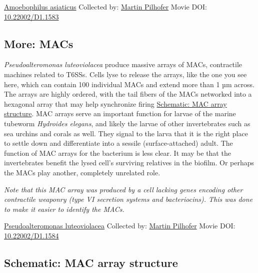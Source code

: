 \documentclass[]{tufte-book}
\begin{document}
\hypertarget{htmlwidget-f246613a8b3240c64a16}{}

\label{fig:9-7a}\protect\hyperlink{tree}{Amoebophilus asiaticus} Collected by: \protect\hyperlink{martin_pilhofer}{Martin Pilhofer} Movie DOI: \href{https://doi.org/10.22002/D1.1583}{10.22002/D1.1583}

\hypertarget{MACs}{%
\subsection*{More: MACs}\label{MACs}}

\emph{Pseudoalteromonas luteoviolacea} produce massive arrays of MACs, contractile machines related to T6SSs. Cells lyse to release the arrays, like the one you see here, which can contain 100 individual MACs and extend more than 1 µm across. The arrays are highly ordered, with the tail fibers of the MACs networked into a hexagonal array that may help synchronize firing \protect\hyperlink{MAC_array_structure}{Schematic: MAC array structure}. MAC arrays serve an important function for larvae of the marine tubeworm \emph{Hydroides elegans}, and likely the larvae of other invertebrates such as sea urchins and corals as well. They signal to the larva that it is the right place to settle down and differentiate into a sessile (surface-attached) adult. The function of MAC arrays for the bacterium is less clear. It may be that the invertebrates benefit the lysed cell's surviving relatives in the biofilm. Or perhaps the MACs play another, completely unrelated role.

\emph{Note that this MAC array was produced by a cell lacking genes encoding other contractile weaponry (type VI secretion systems and bacteriocins). This was done to make it easier to identify the MACs.}



\hypertarget{htmlwidget-1ae8525a68517741a60a}{}

\label{fig:9-7b}\protect\hyperlink{tree}{Pseudoalteromonas luteoviolacea} Collected by: \protect\hyperlink{martin_pilhofer}{Martin Pilhofer} Movie DOI: \href{https://doi.org/10.22002/D1.1584}{10.22002/D1.1584}

\hypertarget{MAC_array_structure}{%
\subsection*{Schematic: MAC array structure}\label{MAC_array_structure}}
\end{document}
